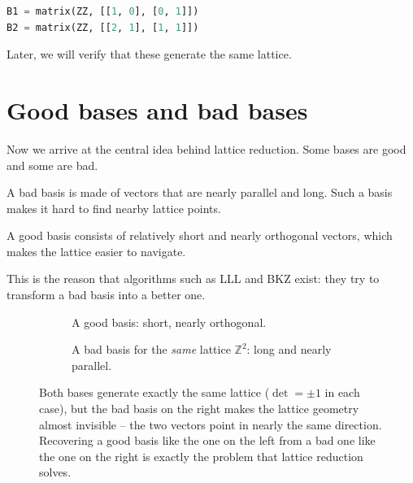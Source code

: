 \begin{lstlisting}[language=Python]
B1 = matrix(ZZ, [[1, 0], [0, 1]])
B2 = matrix(ZZ, [[2, 1], [1, 1]])
\end{lstlisting}

Later, we will verify that these generate the same lattice.

\section{Good bases and bad bases}
Now we arrive at the central idea behind lattice reduction. Some bases are good and some are bad.

A bad basis is made of vectors that are nearly parallel and long. Such a basis makes it hard to find nearby lattice points.

A good basis consists of relatively short and nearly orthogonal vectors, which makes the lattice easier to navigate.

This is the reason that algorithms such as LLL and BKZ exist: they try to transform a bad basis into a better one.

\begin{figure}[H]
\centering
\begin{subfigure}[t]{0.47\textwidth}
\centering
{}
\caption{A good basis: short, nearly orthogonal.}
\end{subfigure}
\hfill
\begin{subfigure}[t]{0.47\textwidth}
\centering
{}
\caption{A bad basis for the \emph{same} lattice $\mathbb{Z}^2$: long and nearly parallel.}
\end{subfigure}
\caption{Both bases generate exactly the same lattice ($\det=\pm1$ in each case), but the bad basis on the right makes the lattice geometry almost invisible -- the two vectors point in nearly the same direction. Recovering a good basis like the one on the left from a bad one like the one on the right is exactly the problem that lattice reduction solves.}
\label{fig:good-bad-basis}
\end{figure}

